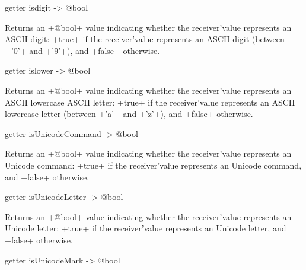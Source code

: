 
\begin{galgas}
getter isdigit -> @bool
\end{galgas}

Returns an \ggs+@bool+ value indicating whether the receiver'value represents an ASCII digit: \ggs+true+ if the receiver'value represents an ASCII digit (between \ggs+'0'+ and \ggs+'9'+), and \ggs+false+ otherwise.






\begin{galgas}
getter islower -> @bool
\end{galgas}

Returns an \ggs+@bool+ value indicating whether the receiver'value represents an ASCII lowercase ASCII letter: \ggs+true+ if the receiver'value represents an ASCII lowercase letter (between \ggs+'a'+ and \ggs+'z'+), and \ggs+false+ otherwise.







\begin{galgas}
getter isUnicodeCommand -> @bool
\end{galgas}

Returns an \ggs+@bool+ value indicating whether the receiver'value represents an Unicode command: \ggs+true+ if the receiver'value represents an Unicode command, and \ggs+false+ otherwise.







\begin{galgas}
getter isUnicodeLetter -> @bool
\end{galgas}

Returns an \ggs+@bool+ value indicating whether the receiver'value represents an Unicode letter: \ggs+true+ if the receiver'value represents an Unicode letter, and \ggs+false+ otherwise.







\begin{galgas}
getter isUnicodeMark -> @bool
\end{galgas}

